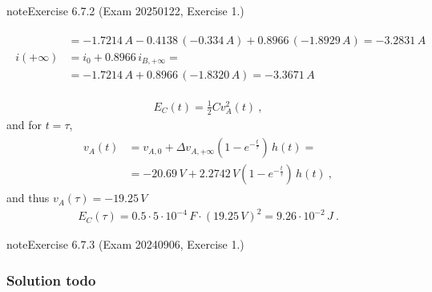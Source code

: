 \documentclass[letterpaper,10pt,english]{jupyterBook}
\begin{document}
\begin{sphinxadmonition}{note}{Exercise 6.7.2 (Exam 2025\sphinxhyphen{}01\sphinxhyphen{}22, Exercise 1.)}
\begin{itemize}
\begin{equation*}
\begin{split}
\begin{aligned}
                & = -1.7214 \, A - 0.4138 \, (-0.334 \, A) + 0.8966 \, (-1.8929 \, A) = -3.2831 \, A \\
     i(+\infty) & = i_{0} + 0.8966 \, i_{B,+\infty} = \\ 
                & = -1.7214 \, A + 0.8966 \, (-1.8320 \, A) = - 3.3671 \, A 
   \end{aligned}\end{split}
\end{equation*}
\end{itemize}



\sphinxAtStartPar
{}
\begin{equation*}
\begin{split}E_C(t) = \frac{1}{2} C v_A^2(t) \ ,\end{split}
\end{equation*}
\sphinxAtStartPar
and for \(t = \tau\),
\begin{equation*}
\begin{split}\begin{aligned}
  v_A(t)
  & = v_{A,0} + \Delta v_{A,+\infty} \left( 1 - e^{-\frac{t}{\tau}} \right) \, h(t) = \\
  & = -20.69 \, V + 2.2742 \, V \left( 1 - e^{-\frac{t}{\tau}} \right) \, h(t) \ ,
\end{aligned}\end{split}
\end{equation*}
\sphinxAtStartPar
and thus \(v_A(\tau) = -19.25 \, V\)
\begin{equation*}
\begin{split}E_C(\tau) = 0.5 \cdot 5 \cdot 10^{-4} \, F \cdot ( 19.25 \, V )^2 = 9.26 \cdot 10^{-2} \, J \ .\end{split}
\end{equation*}\end{sphinxadmonition}
 \label{exercise:exam-24-09-06-exe-01}

\begin{sphinxadmonition}{note}{Exercise 6.7.3 (Exam 2024\sphinxhyphen{}09\sphinxhyphen{}06, Exercise 1.)}



\begin{figure}[htbp]
\centering

\noindent{}
\end{figure}
\subsubsection*{Solution \sphinxhyphen{} todo}
\end{sphinxadmonition}
 \label{exercise:exam-24-07-22-exe-01}
\end{document}
